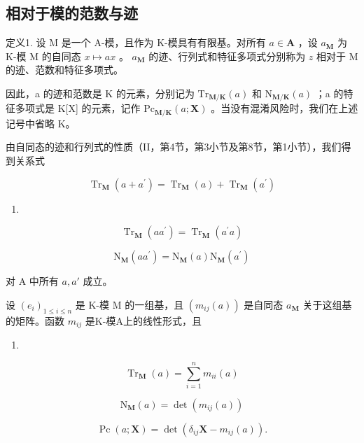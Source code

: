 \subsection{相对于模的范数与迹}

定义1. 设 M 是一个 A-模，且作为 K-模具有有限基。对所有 \(a \in \mathbf{A}\) ，设 \(a_{\mathbf{M}}\) 为 K-模 M 的自同态 \(x \mapsto ax\) 。 \(a_{\mathbf{M}}\) 的迹、行列式和特征多项式分别称为 \(z\) 相对于 M 的迹、范数和特征多项式。

因此，a 的迹和范数是 K 的元素，分别记为 \(\mathrm{Tr}_{\mathbf{M}/\mathbf{K}}(a)\) 和 \(\mathrm{N}_{\mathbf{M}/\mathbf{K}}(a)\) ；a 的特征多项式是 K{[}X{]} 的元素，记作 \(\mathrm{Pc}_{\mathbf{M}/\mathbf{K}}(a;\mathbf{X})\) 。当没有混淆风险时，我们在上述记号中省略 K。

由自同态的迹和行列式的性质（II，第4节，第3小节及第8节，第1小节），我们得到关系式

\[
\operatorname{Tr} _ {\mathbf {M}} (a + a ^ {\prime}) = \operatorname{Tr} _ {\mathbf {M}} (a) + \operatorname{Tr} _ {\mathbf {M}} (a ^ {\prime})\tag{1}
\]

\begin{enumerate}
\def\labelenumi{(\arabic{enumi})}
\setcounter{enumi}{1}
\tightlist
\item
\end{enumerate}

\[
\operatorname{Tr} _ {\mathbf {M}} (a a ^ {\prime}) = \operatorname{Tr} _ {\mathbf {M}} (a ^ {\prime} a)\tag{3}
\]

\[
\mathrm{N} _ {\mathbf {M}} (a a ^ {\prime}) = \mathrm{N} _ {\mathbf {M}} (a) \mathrm{N} _ {\mathbf {M}} (a ^ {\prime})
\]

对 A 中所有 \(a, a'\) 成立。

设 \((e_i)_{1\leq i\leq n}\) 是 K-模 M 的一组基，且 \((m_{ij}(a))\) 是自同态 \(a_{\mathbf{M}}\) 关于这组基的矩阵。函数 \(m_{ij}\) 是K-模A上的线性形式，且

\begin{enumerate}
\def\labelenumi{(\arabic{enumi})}
\setcounter{enumi}{3}
\tightlist
\item
\end{enumerate}

\[
\operatorname{Tr} _ {\mathbf {M}} (a) = \sum_ {i = 1} ^ {n} m _ {i i} (a)\tag{5}
\]

\[
\mathrm{N} _ {\mathbf {M}} (a) = \det (m _ {i j} (a))\tag{6}
\]

\[
\operatorname{Pc} (a; \mathbf {X}) = \det (\delta_ {i j} \mathbf {X} - m _ {i j} (a)).
\]

